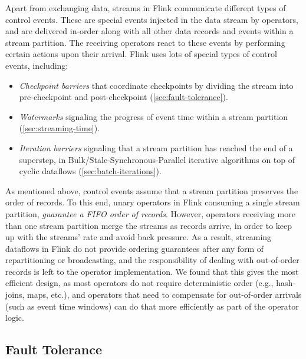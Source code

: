  Apart from exchanging data, streams in Flink communicate different types of control events. These are special events injected in the data stream by operators, and are delivered in-order along with all other data records and events within a stream partition. The receiving operators react to these events by performing certain actions upon their arrival. Flink uses lots of special types of control events, including: \vspace{-2mm}
\begin{itemize}
\item \textit{Checkpoint barriers} that coordinate checkpoints by dividing the stream into pre-checkpoint and post-checkpoint (\autoref{sec:fault-tolerance}). \vspace{-3mm}
\item \textit{Watermarks} signaling the progress of event time within a stream partition (\autoref{sec:streaming-time}). \vspace{-3mm}
\item \textit{Iteration barriers} signaling that a stream partition has reached the end of a superstep, in Bulk/Stale-Synchronous-Parallel iterative algorithms on top of cyclic dataflows (\autoref{sec:batch-iterations}). \vspace{-1mm}
\end{itemize}

As mentioned above, control events assume that a stream partition preserves the order of records. To this end, unary operators in Flink consuming a single stream partition, \emph{guarantee a FIFO order of records}. However, operators receiving more than one stream partition merge the streams as records arrive, in order to keep up with the streams' rate and avoid back pressure. As a result, streaming dataflows in Flink do not provide ordering guarantees after any form of repartitioning or broadcasting, and the responsibility of dealing with out-of-order records is left to the operator implementation. We found that this gives the most efficient design, as most operators do not require deterministic order (e.g., hash-joins, maps, etc.), and operators that need to compensate for out-of-order arrivals (such as event time windows) can do that more efficiently as part of the operator logic.

\subsection{Fault Tolerance}
\label{sec:fault-tolerance}

